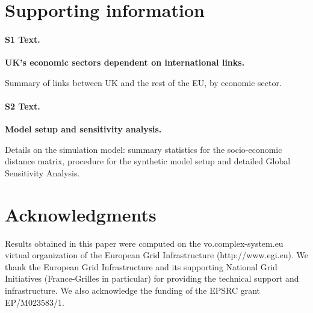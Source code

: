 \documentclass[10pt,letterpaper]{article}
\begin{document}


\section*{Supporting information}

\paragraph*{S1 Text.}
\label{S1Text}
{\bf UK's economic sectors dependent on international links.}

Summary of links between UK and the rest of the EU, by economic sector.

\paragraph*{S2 Text.}
\label{S2Text}
{\bf Model setup and sensitivity analysis.}

Details on the simulation model: summary statistics for the socio-economic distance matrix, procedure for the synthetic model setup and detailed Global Sensitivity Analysis.



\section*{Acknowledgments}

Results obtained in this paper were computed on the vo.complex-system.eu virtual organization of the European Grid Infrastructure (http://www.egi.eu). We thank the European Grid Infrastructure and its supporting National Grid Initiatives (France-Grilles in particular) for providing the technical support and infrastructure. We also acknowledge the funding of the EPSRC grant EP/M023583/1.




\end{document}
